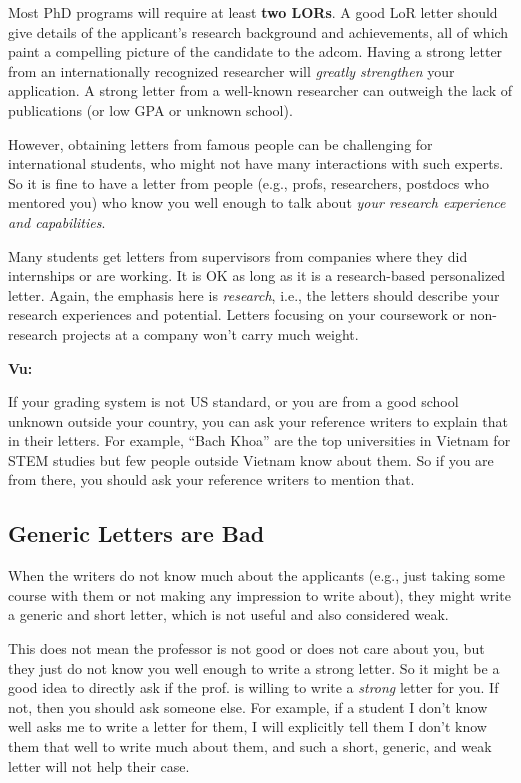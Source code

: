 \documentclass[oneside,11pt,dvipsnames]{book}
\newenvironment{commentbox}[1][]{
  \small
  \begin{mybox}
    {\small \textbf{#1}}
  }{
  \end{mybox}
}
\begin{document}
Most PhD programs will require at least \textbf{two LORs}. A good LoR letter should give details of the applicant's research background and achievements, all of which paint a compelling picture of the candidate to the adcom.
Having a strong letter from an internationally recognized researcher will \emph{greatly strengthen} your application. A strong letter from a well-known researcher can outweigh the lack of publications (or low GPA or unknown school).


However, obtaining letters from famous people
can be challenging for international students, who might not have many interactions with such experts. So it is fine to have a letter from people (e.g., profs, researchers, postdocs who mentored you) who know you well enough to talk about \emph{your research experience and capabilities}. 

Many students get letters from supervisors from companies where they did internships or are working.  It is OK as long as it is a research-based personalized letter. Again, the emphasis here is \emph{research}, i.e., the letters should describe your research experiences and potential. Letters focusing on your coursework or non-research projects at a company won't carry much weight.

\begin{commentbox}[Vu:]
  If your grading system is not US standard, or you are from a good school unknown outside your country, you can ask your reference writers to explain that in their letters.  For example, ``Bach Khoa'' are the top universities in Vietnam for STEM studies but few people outside Vietnam know about them.  So if you are from there, you should ask your reference writers to mention that.
\end{commentbox}


\subsection{Generic Letters are Bad} When the writers do not know much about the applicants (e.g., just taking some course with them or not making any impression to write about), they might write a generic and short letter, which is not useful and also considered weak. 

This does not mean the professor is not good or does not care about you, but they just do not know you well enough to write a strong letter.
So it might be a good idea to directly ask if the prof. is willing to write a \emph{strong} letter for you. If not, then you should ask someone else.  For example, if a student I don't know well asks me to write a letter for them, I will explicitly tell them I don't know them that well to write much about them, and such a short, generic, and weak letter will not help their case.
\end{document}

